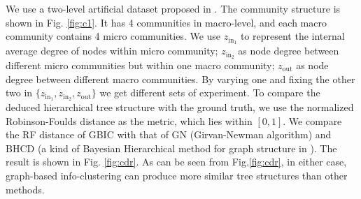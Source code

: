 We use a two-level artificial dataset proposed in \cite{RN22}. 
The community structure is shown in Fig. \ref{fig:c1}. It has 4 communities in macro-level, and each macro community contains 4 micro communities. We use $z_{\mathrm{in}_1}$ to represent the internal average degree of nodes within micro community; $z_{\mathrm{in}_2}$ as node degree between different micro communities but within one macro community; $z_{\mathrm{out}}$ as node degree between different macro communities. By varying one and fixing the other two in $\{z_{\mathrm{in}_1}, z_{\mathrm{in}_2}, z_{\mathrm{out}} \}$ we get different sets of experiment.
To compare the deduced hierarchical tree structure with the ground truth, we use the normalized Robinson-Foulds distance as the metric, which lies within $[0,1]$. We compare the RF distance of GBIC with that of GN (Girvan-Newman algorithm) and BHCD (a kind of Bayesian Hierarchical method for graph structure in \cite{RN23}). The result is shown in Fig. \ref{fig:cdr}. As can be seen from Fig.\ref{fig:cdr}, in either case, graph-based info-clustering can produce more similar tree structures than other methods.
